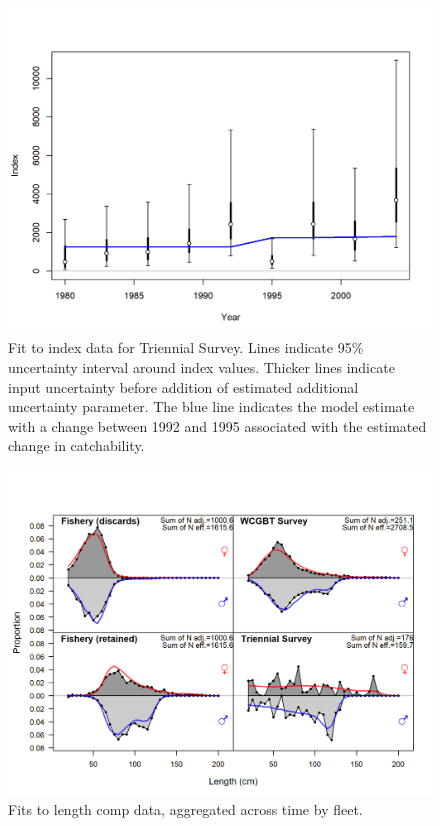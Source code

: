 \documentclass[12pt,]{article}
\begin{document}
\begin{figure}
\centering
\includegraphics{r4ss/plots_mod1/index2_cpuefit_Triennial Survey.png}
\caption{Fit to index data for Triennial Survey. Lines indicate 95\%
uncertainty interval around index values. Thicker lines indicate input
uncertainty before addition of estimated additional uncertainty
parameter. The blue line indicates the model estimate with a change
between 1992 and 1995 associated with the estimated change in
catchability.\label{fig:index2_cpuefit_Triennial}}
\end{figure}

\begin{figure}
\centering
\includegraphics{r4ss/plots_mod1/comp_lenfit__aggregated_across_time.png}
\caption{Fits to length comp data, aggregated across time by fleet.
\label{fig:comp_lenfit_aggregated_across_time}}
\end{figure}
\end{document}
